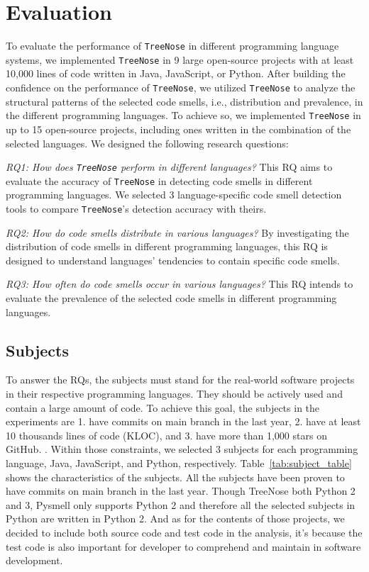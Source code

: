 

\section{Evaluation}
\label{sec:evaluation}

To evaluate the performance of \texttt{TreeNose} in different programming language systems,
we implemented \texttt{TreeNose} in 9 large open-source projects with at least 10,000 lines of code written in Java, JavaScript, or
Python. After building the confidence on the performance of \texttt{TreeNose}, we utilized \texttt{TreeNose} to analyze the structural patterns
of the selected code smells, i.e., distribution and prevalence, in the different programming languages. To achieve so, we implemented \texttt{TreeNose} in up to 15 open-source projects, including
ones written in the combination of the selected languages. We designed the following research questions:

{\it RQ1: How does \texttt{TreeNose} perform in different languages?}
This RQ aims to evaluate the accuracy of \texttt{TreeNose} in detecting code smells in different programming languages. 
We selected 3 language-specific code smell detection tools to compare \texttt{TreeNose}'s detection accuracy with theirs.

{\it RQ2: How do code smells distribute in various languages?}
By investigating the distribution of code smells in different programming languages, this RQ is designed to understand 
languages' tendencies to contain specific code smells.

{\it RQ3: How often do code smells occur in various languages?}
This RQ intends to evaluate the prevalence of the selected code smells in different programming languages.

\subsection{Subjects}
\label{sec:subjects}

To answer the RQs, the subjects must stand for the real-world software projects in their respective 
programming languages. They should be actively used and contain a large amount of code. To achieve this goal, the subjects in the 
experiments are 1. have commits on main branch in the last year, 2. have at least 10 thousands lines of code (KLOC), and 3. have more than 1,000 stars on GitHub.
. Within those constraints, we selected 3 subjects for each programming language, Java, JavaScript, and Python, respectively.
Table~\ref{tab:subject_table} shows the characteristics of the subjects. All the subjects have been proven to have commits on main branch in the last year.
Though TreeNose both Python 2 and 3, Pysmell only supports Python 2 and therefore all the selected subjects in Python are written in Python 2.
And as for the contents of those projects, we decided to include both source code and test code in the analysis, 
it's because the test code is also important for developer to comprehend and maintain in software development.

